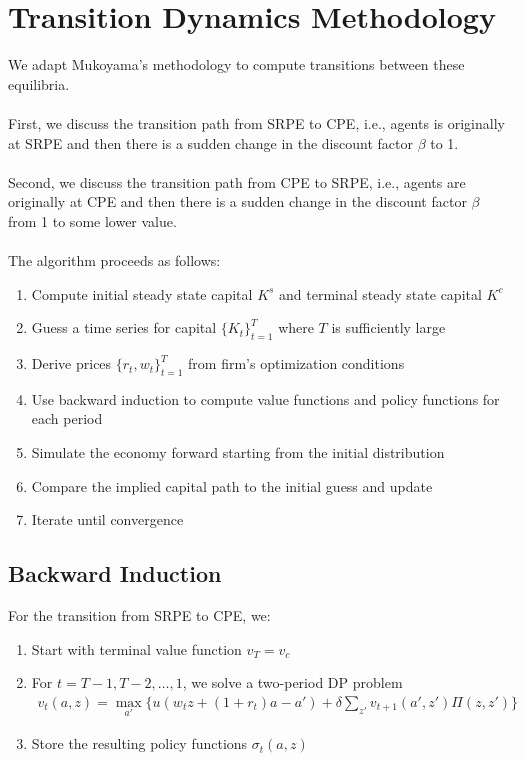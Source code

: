 \documentclass[11pt,a4paper]{article}
\begin{document}
\section{Transition Dynamics Methodology}\label{sec:transition}
We adapt Mukoyama's methodology to compute transitions between these equilibria.\\
\\
First, we discuss the transition path from SRPE to CPE, i.e., agents is originally at SRPE and then there is a sudden change in the discount factor $\beta$ to 1.\\
\\
Second, we discuss the transition path from CPE to SRPE, i.e., agents are originally at CPE and then there is a sudden change in the discount factor $\beta$  from  1 to some lower value.\\
\\

\noindent The algorithm proceeds as follows:

\begin{enumerate}
    \item Compute initial steady state capital $K^s$ and terminal steady state capital $K^c$
    \item Guess a time series for capital $\{K_t\}_{t=1}^T$ where $T$ is sufficiently large
    \item Derive prices $\{r_t,w_t\}_{t=1}^T$ from firm's optimization conditions
    \item Use backward induction to compute value functions and policy functions for each period
    \item Simulate the economy forward starting from the initial distribution
    \item Compare the implied capital path to the initial guess and update
    \item Iterate until convergence
\end{enumerate}

\subsection{Backward Induction}

For the transition from SRPE to CPE, we:
\begin{enumerate}
    \item Start with terminal value function $v_T = v_c$
    \item For $t = T-1, T-2, \ldots, 1$, we solve a two-period DP problem 
        \begin{align}
            v_t(a,z) = \max_{a'} \{u(w_tz + (1+r_t)a - a') + \delta\sum_{z'} v_{t+1}(a',z')\Pi(z,z')\}
        \end{align}
    \item Store the resulting policy functions $\sigma_t(a,z)$
\end{enumerate}
\end{document}
